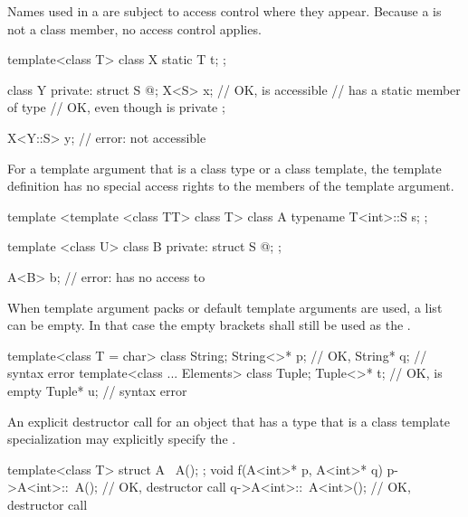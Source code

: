 \pnum
\begin{note}
Names used in a 
are subject to access control where they appear.
Because a  is not a class member,
no access control applies.
\end{note}
\begin{example}
\begin{codeblock}
template<class T> class X {
  static T t;
};

class Y {
private:
  struct S { @\commentellip@ };
  X<S> x;           // OK,  is accessible
                    //  has a static member of type 
                    // OK, even though  is private
};

X<Y::S> y;          // error:  not accessible
\end{codeblock}
\end{example}
For a template argument that is a class type or a class template,
the template definition has no special access rights
to the members of the template argument.
\begin{example}
\begin{codeblock}
template <template <class TT> class T> class A {
  typename T<int>::S s;
};

template <class U> class B {
private:
  struct S { @\commentellip@ };
};

A<B> b;             // error:  has no access to 
\end{codeblock}
\end{example}

\pnum
When template argument packs or default template arguments are used,
a  list can be empty.
In that case the empty
\tcode{<>}
brackets shall still be used as the
.
\begin{example}
\begin{codeblock}
template<class T = char> class String;
String<>* p;                    // OK, 
String* q;                      // syntax error
template<class ... Elements> class Tuple;
Tuple<>* t;                     // OK,  is empty
Tuple* u;                       // syntax error
\end{codeblock}
\end{example}

\pnum
An explicit destructor call for an object that has a type
that is a class template specialization may explicitly specify the
.
\begin{example}
\begin{codeblock}
template<class T> struct A {
  ~A();
};
void f(A<int>* p, A<int>* q) {
  p->A<int>::~A();              // OK, destructor call
  q->A<int>::~A<int>();         // OK, destructor call
}
\end{codeblock}
\end{example}

